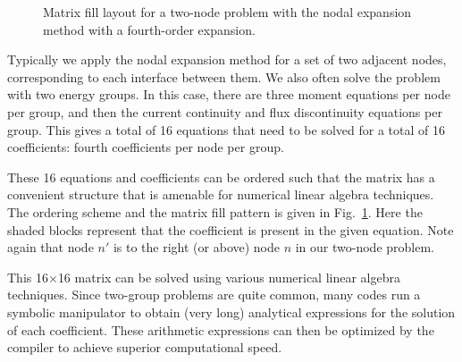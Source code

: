 \begin{figure}[tb!]
\begin{center}
\begin{center}
\end{center}

\caption{Matrix fill layout for a two-node problem with the nodal expansion method with a fourth-order expansion.}
\label{Fig:diffusion_NodalExpansion_2Node2Group_SparsityPattern}
\end{center}
\end{figure}

Typically we apply the nodal expansion method for a set of two adjacent nodes, corresponding to each interface between them. We also often solve the problem with two energy groups. In this case, there are three moment equations per node per group, and then the current continuity and flux discontinuity equations per group. This gives a total of 16 equations that need to be solved for a total of 16 coefficients: fourth coefficients per node per group.

These 16 equations and coefficients can be ordered such that the matrix has a convenient structure that is amenable for numerical linear algebra techniques. The ordering scheme and the matrix fill pattern is given in Fig.~\ref{Fig:diffusion_NodalExpansion_2Node2Group_SparsityPattern}. Here the shaded blocks represent that the coefficient is present in the given equation. Note again that node $n'$ is to the right (or above) node $n$ in our two-node problem.

This 16$\times$16 matrix can be solved using various numerical linear algebra techniques. Since two-group problems are quite common, many codes run a symbolic manipulator to obtain (very long) analytical expressions for the solution of each coefficient. These arithmetic expressions can then be optimized by the compiler to achieve superior computational speed.



